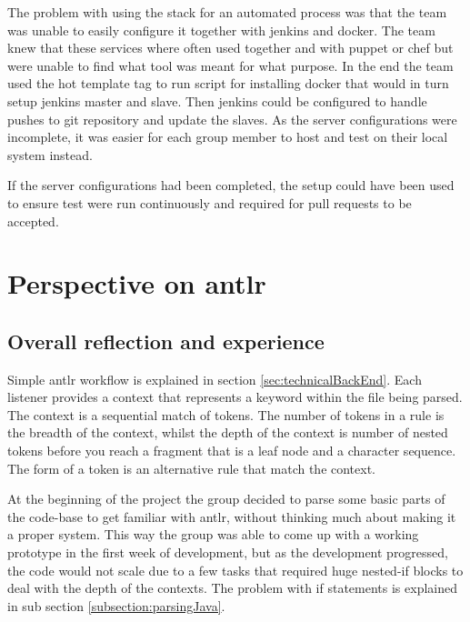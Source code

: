 

The problem with using the stack for an automated process was that the team was unable to easily configure it together with \gls{jenkins} and \gls{docker}. The team knew that these services where often used together and with \gls{puppet} or \gls{chef} but were unable to find what tool was meant for what purpose. In the end the team used the \gls{hot} template tag to run script for installing docker that would in turn setup \gls{jenkins} master and slave. Then \gls{jenkins} could be configured to handle pushes to \gls{git} repository and update the slaves. As the server configurations were incomplete, it was easier for each group member to host and test on their local system instead.

If the server configurations had been completed, the setup could have been used to ensure test were run continuously and required for pull requests to be accepted. 

\section{Perspective on antlr}
\subsection{Overall reflection and experience}
Simple \Gls{antlr} workflow is explained in section \ref{sec:technicalBackEnd}. Each listener provides a context that represents a keyword within the file being parsed. The context is a sequential match of tokens. The number of tokens in a rule is the breadth of the context, whilst the depth of the context is number of nested tokens before you reach a fragment that is a leaf node and a character sequence. The form of a token is an alternative rule that match the context.  

At the beginning of the project the group decided to parse some basic parts of the code-base to get familiar with \gls{antlr}, without thinking much about making it a proper system. This way the group was able to come up with a working prototype in the first week of development, but as the development progressed, the code would not scale due to a few tasks that required huge nested-if blocks to deal with the depth of the contexts. The problem with if statements is explained in sub section \ref{subsection:parsingJava}.

